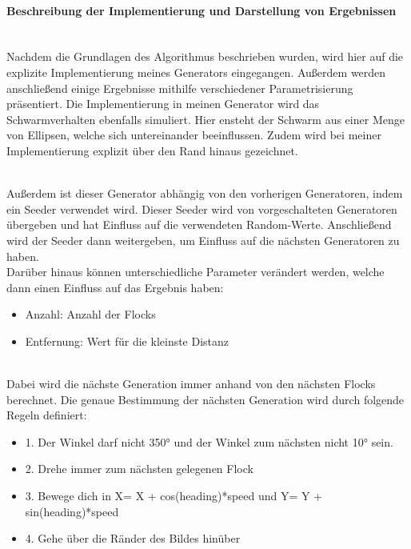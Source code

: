 \documentclass[../mciAusarbeitung.tex]{subfiles}
\begin{document}
            \paragraph{Beschreibung der Implementierung und Darstellung von Ergebnissen}$~$ \\
            Nachdem die Grundlagen des Algorithmus beschrieben wurden, wird hier auf die explizite Implementierung meines Generators eingegangen. Außerdem werden anschließend einige Ergebnisse mithilfe verschiedener Parametrisierung präsentiert.
            Die Implementierung in meinen Generator wird das Schwarmverhalten ebenfalls simuliert. Hier ensteht der Schwarm aus einer Menge von Ellipsen, welche sich untereinander beeinflussen. Zudem wird bei meiner Implementierung explizit über den Rand hinaus gezeichnet.
            
            $~$ \\Außerdem ist dieser Generator abhängig von den vorherigen Generatoren, indem ein Seeder verwendet wird. Dieser Seeder wird von vorgeschalteten Generatoren übergeben und hat Einfluss auf die verwendeten Random-Werte. Anschließend wird der Seeder dann weitergeben, um Einfluss auf die nächsten Generatoren zu haben.
            $~$ \\Darüber hinaus können unterschiedliche Parameter verändert werden, welche dann einen Einfluss auf das Ergebnis haben:
            
            \begin{itemize}
 \item Anzahl:	Anzahl der Flocks
 \item Entfernung:	Wert für die kleinste Distanz
\end{itemize}
            
           $~$ \\Dabei wird die nächste Generation immer anhand von den nächsten Flocks berechnet.  Die genaue Bestimmung der nächsten Generation wird durch folgende Regeln definiert: 
            
\begin{itemize}
 \item 1.	Der Winkel darf nicht 350° und der Winkel zum nächsten nicht 10° sein.
 \item 2.	Drehe immer zum nächsten gelegenen Flock
 \item 3.	Bewege dich in X= X + cos(heading)*speed und Y= Y + sin(heading)*speed
 \item 4.	Gehe über die Ränder des Bildes hinüber
\end{itemize}
\end{document}
